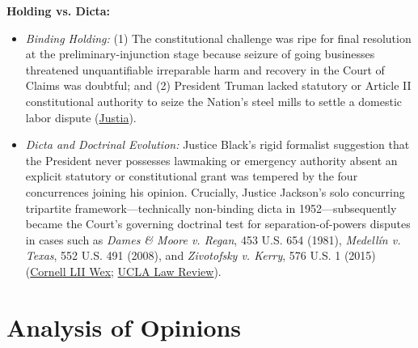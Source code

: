 \documentclass[12pt]{article}
\begin{document}
\textbf{Holding vs. Dicta:}
\begin{itemize}
\item \textit{Binding Holding:} (1) The constitutional challenge was ripe for final resolution at the preliminary-injunction stage because seizure of going businesses threatened unquantifiable irreparable harm and recovery in the Court of Claims was doubtful; and (2) President Truman lacked statutory or Article II constitutional authority to seize the Nation's steel mills to settle a domestic labor dispute (\href{https://supreme.justia.com/cases/federal/us/343/579/}{Justia}).
\item \textit{Dicta and Doctrinal Evolution:} Justice Black's rigid formalist suggestion that the President never possesses lawmaking or emergency authority absent an explicit statutory or constitutional grant was tempered by the four concurrences joining his opinion. Crucially, Justice Jackson's solo concurring tripartite framework---technically non-binding dicta in 1952---subsequently became the Court's governing doctrinal test for separation-of-powers disputes in cases such as \textit{Dames \& Moore v. Regan}, 453 U.S. 654 (1981), \textit{Medell\'{i}n v. Texas}, 552 U.S. 491 (2008), and \textit{Zivotofsky v. Kerry}, 576 U.S. 1 (2015) (\href{https://www.law.cornell.edu/wex/youngstown_sheet_tube_co._v._sawyer_\%281952\%29}{Cornell LII Wex}; \href{https://www.uclalawreview.org/wp-content/uploads/2019/09/44_54UCLALRev1703August2007.pdf}{UCLA Law Review}).
\end{itemize}

\section{Analysis of Opinions}
\end{document}
